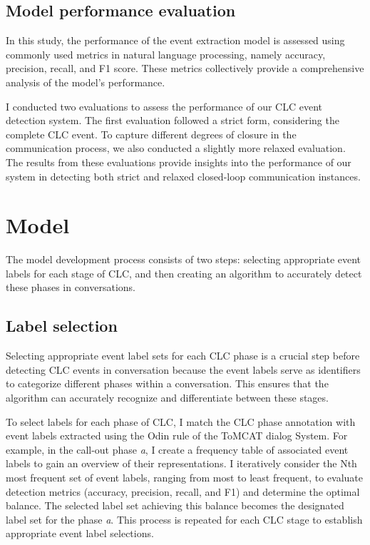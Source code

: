 \documentclass[11pt]{article}
\begin{document}
\subsection{Model performance evaluation}
In this study, the performance of the event extraction model is assessed using commonly used metrics in natural language processing, namely accuracy, precision, recall, and F1 score. These metrics collectively provide a comprehensive analysis of the model's performance.

I conducted two evaluations to assess the performance of our CLC event detection system. The first evaluation followed a strict form, considering the complete CLC event. To capture different degrees of closure in the communication process, we also conducted a slightly more relaxed evaluation. The results from these evaluations provide insights into the performance of our system in detecting both strict and relaxed closed-loop communication instances.

\section{Model}
The model development process consists of two steps: selecting appropriate event labels for each stage of CLC, and then creating an algorithm to accurately detect these phases in conversations.

\subsection{Label selection}
Selecting appropriate event label sets for each CLC phase is a crucial step before detecting CLC events in conversation because the event labels serve as identifiers to categorize different phases within a conversation. This ensures that the algorithm can accurately recognize and differentiate between these stages.

To select labels for each phase of CLC, I match the CLC phase annotation with event labels extracted using the Odin rule of the ToMCAT dialog System. For example, in the call-out phase \textit{a}, I create a frequency table of associated event labels to gain an overview of their representations. I iteratively consider the Nth most frequent set of event labels, ranging from most to least frequent, to evaluate detection metrics (accuracy, precision, recall, and F1) and determine the optimal balance. The selected label set achieving this balance becomes the designated label set for the phase \textit{a}. This process is repeated for each CLC stage to establish appropriate event label selections. 
\end{document}
